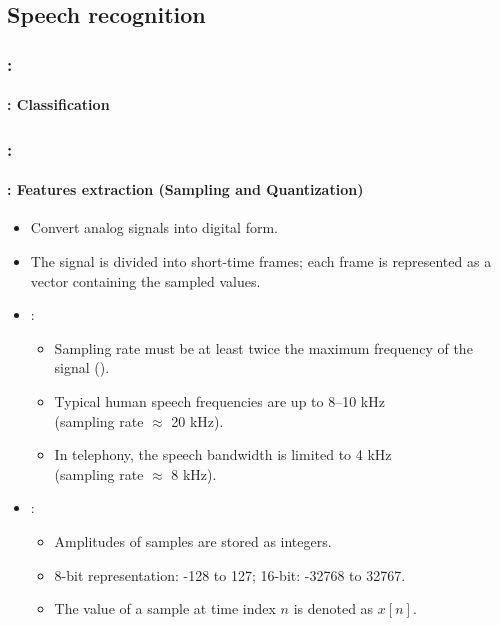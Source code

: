 \documentclass[xcolor=table]{beamer}
\begin{document}
\subsection{Speech recognition}

\begin{frame}
	\frametitle{\insertshortsubtitle: \insertsection}
	\framesubtitle{\insertsubsection: Classification}
	
	
\end{frame}

\begin{frame}
	\frametitle{\insertshortsubtitle: \insertsection}
	\framesubtitle{\insertsubsection: Features extraction (Sampling and Quantization)}
	
	\begin{itemize}
		\item Convert analog signals into digital form.
		\item The signal is divided into short-time frames; each frame is represented as a vector containing the sampled values.
		\item {}:
		\begin{itemize}
			\item Sampling rate must be at least twice the maximum frequency of the signal ().
			\item Typical human speech frequencies are up to 8--10 kHz\\ (sampling rate $\approx$ 20 kHz).
			\item In telephony, the speech bandwidth is limited to 4 kHz\\ (sampling rate $\approx$ 8 kHz).
		\end{itemize}
		\item {}:
		\begin{itemize}
			\item Amplitudes of samples are stored as integers.
			\item 8-bit representation: -128 to 127; 16-bit: -32768 to 32767.
			\item The value of a sample at time index $n$ is denoted as $x[n]$.
		\end{itemize}
	\end{itemize}
	
\end{frame}
\end{document}
